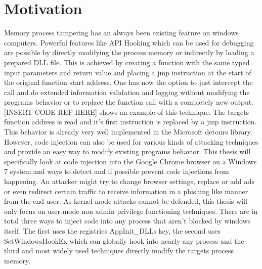 \section{Motivation}

Memory process tampering has an always been existing feature on windows computers. Powerful features like API Hooking which can be used for debugging are possible by directly modifying the process memory or indirectly by loading a prepared DLL file. This is achieved by creating a function with the same typed input parameters and return value and placing a jmp instruction at the start of the original function start address. One has now the option to just intercept the call and do extended information validation and logging without modifying the programs behavior or to replace the function call with a completely new output. [INSERT CODE REF HERE] shows an example of this technique. The targets function address is read and it's first instruction is replaced by a jmp instruction. This behavior is already very well implemented in the Microsoft detours library\cite{msdetours}.
However, code injection can also be used for various kinds of attacking techniques and provide an easy way to modify existing programs behavior. This thesis will specifically look at code injection into the Google Chrome browser on a Windows 7 system and ways to detect and if possible prevent code injections from happening. An attacker might try to change browser settings, replace or add ads or even redirect certain traffic to receive information in a phishing like manner from the end-user. As kernel-mode attacks cannot be defended, this thesis will only focus on user-mode non admin privilege functioning techniques. There are in total three ways to inject code into any process that aren't blocked by windows itself. The first
uses the registries AppInit\_DLLs key, the second uses SetWindowsHookEx which can globally hook into nearly any process and the third and most widely used techniques directly modify the targets process memory.

